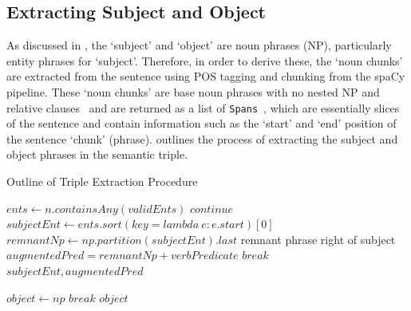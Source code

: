 \subsection*{Extracting Subject and Object} \label{extracting_subj_obj}
As discussed in , the `subject' and `object' are noun phrases (NP), particularly entity phrases for `subject'. Therefore, in order to derive these, the `noun chunks' are extracted from the sentence using POS tagging and chunking from the spaCy pipeline. These `noun chunks' are base noun phrases with no nested NP and relative clauses~\cite{spacy} and are returned as a list of \texttt{Spans}~\cite{spacy}, which are essentially slices of the sentence and contain information such as the `start' and `end' position of the sentence `chunk' (phrase).  outlines the process of extracting the subject and object phrases in the semantic triple.

\begin{algorithm}[H]
  \caption{Outline of Triple Extraction Procedure}
  \label{alg:subject_relation}
  \begin{algorithmic}   
    
      \State $ents \gets n.containsAny(validEnts)$ 
        \State $continue$
        \EndIf
      \State $subjectEnt \gets ents.sort(key = lambda \ e: e.start)[0]$
      \State $remnantNp \gets np.partition(subjectEnt).last$ 
      \Comment remnant phrase right of subject
      \State $augmentedPred = remnantNp + verbPredicate $
      \State $break$
      \EndIf
    \EndFor
    \State \Return $subjectEnt, augmentedPred$
  \EndFunction

      \State $object \gets np$ 
      \State $break$
      \EndIf
    \EndFor
    \State \Return $object$
  \EndFunction
\end{algorithmic}
\end{algorithm}

\vspace{-3ex}
